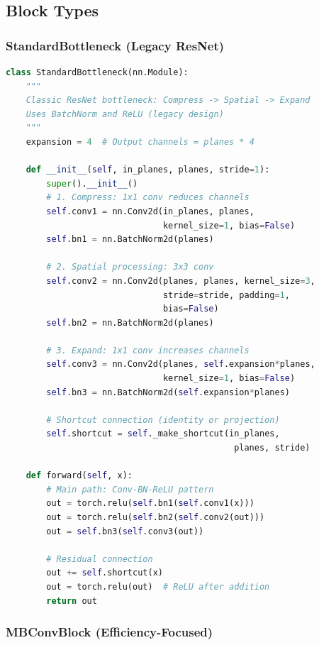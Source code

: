 \documentclass{article}
\begin{document}
\subsection{Block Types}

\subsubsection{StandardBottleneck (Legacy ResNet)}

\begin{lstlisting}[language=Python, caption=ResNet Bottleneck Block]
class StandardBottleneck(nn.Module):
    """
    Classic ResNet bottleneck: Compress -> Spatial -> Expand
    Uses BatchNorm and ReLU (legacy design)
    """
    expansion = 4  # Output channels = planes * 4
    
    def __init__(self, in_planes, planes, stride=1):
        super().__init__()
        # 1. Compress: 1x1 conv reduces channels
        self.conv1 = nn.Conv2d(in_planes, planes, 
                               kernel_size=1, bias=False)
        self.bn1 = nn.BatchNorm2d(planes)
        
        # 2. Spatial processing: 3x3 conv
        self.conv2 = nn.Conv2d(planes, planes, kernel_size=3,
                               stride=stride, padding=1, 
                               bias=False)
        self.bn2 = nn.BatchNorm2d(planes)
        
        # 3. Expand: 1x1 conv increases channels
        self.conv3 = nn.Conv2d(planes, self.expansion*planes,
                               kernel_size=1, bias=False)
        self.bn3 = nn.BatchNorm2d(self.expansion*planes)
        
        # Shortcut connection (identity or projection)
        self.shortcut = self._make_shortcut(in_planes, 
                                             planes, stride)
    
    def forward(self, x):
        # Main path: Conv-BN-ReLU pattern
        out = torch.relu(self.bn1(self.conv1(x)))
        out = torch.relu(self.bn2(self.conv2(out)))
        out = self.bn3(self.conv3(out))
        
        # Residual connection
        out += self.shortcut(x)
        out = torch.relu(out)  # ReLU after addition
        return out
\end{lstlisting}

\subsubsection{MBConvBlock (Efficiency-Focused)}
\end{document}
